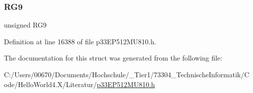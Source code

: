 \subsubsection{\texorpdfstring{R\+G9}{RG9}}
{\footnotesize\ttfamily unsigned R\+G9}



Definition at line 16388 of file p33\+E\+P512\+M\+U810.\+h.



The documentation for this struct was generated from the following file\+:\begin{DoxyCompactItemize}
\item 
C\+:/\+Users/00670/\+Documents/\+Hochschule/\+\_\+\+Tier1/73304\+\_\+\+Technische\+Informatik/\+Code/\+Hello\+World4.\+X/\+Literatur/\hyperlink{p33_e_p512_m_u810_8h}{p33\+E\+P512\+M\+U810.\+h}\end{DoxyCompactItemize}
